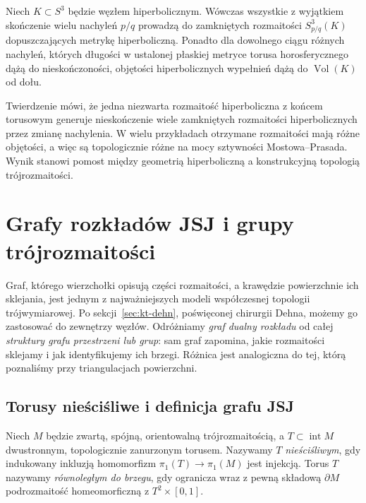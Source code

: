 \begin{twierdzenie}
Niech $K\subset S^3$ będzie węzłem hiperbolicznym.
Wówczas wszystkie z wyjątkiem skończenie wielu nachyleń
$p/q$ prowadzą do zamkniętych rozmaitości
$S^3_{p/q}(K)$ dopuszczających metrykę hiperboliczną.
Ponadto dla dowolnego ciągu różnych nachyleń, których
długości w ustalonej płaskiej metryce torusa horosferycznego
dążą do nieskończoności, objętości hiperbolicznych wypełnień
dążą do $\operatorname{Vol}(K)$ od dołu.
\end{twierdzenie}

\begin{uwaga}
Twierdzenie mówi, że jedna niezwarta rozmaitość hiperboliczna
z końcem torusowym generuje nieskończenie wiele zamkniętych
rozmaitości hiperbolicznych przez zmianę nachylenia.
W wielu przykładach otrzymane rozmaitości mają różne
objętości, a więc są topologicznie różne na mocy sztywności
Mostowa--Prasada. Wynik stanowi pomost między geometrią
hiperboliczną a konstrukcyjną topologią trójrozmaitości.
\end{uwaga}



\chapter{Grafy rozkładów JSJ i grupy trójrozmaitości}
\label{ch:tg-jsj-graphs}

Graf, którego wierzchołki opisują części rozmaitości,
a krawędzie powierzchnie ich sklejania, jest jednym z
najważniejszych modeli współczesnej topologii
trójwymiarowej. Po sekcji~\ref{sec:kt-dehn}, poświęconej
chirurgii Dehna, możemy go zastosować do zewnętrzy węzłów.
Odróżniamy \emph{graf dualny rozkładu}
od całej \emph{struktury grafu przestrzeni lub grup}:
sam graf zapomina, jakie rozmaitości sklejamy i jak
identyfikujemy ich brzegi. Różnica jest analogiczna
do tej, którą poznaliśmy przy triangulacjach powierzchni.

\section{Torusy nieściśliwe i definicja grafu JSJ}
\label{sec:tg-jsj-graph-def}

\begin{definicja}
Niech $M$ będzie zwartą, spójną, orientowalną
trójrozmaitością, a $T\subset\operatorname{int}M$
dwustronnym, topologicznie zanurzonym torusem.  Nazywamy $T$ \emph{nieściśliwym},
gdy indukowany inkluzją homomorfizm
$\pi_1(T)\to\pi_1(M)$ jest injekcją.
Torus $T$ nazywamy \emph{równoległym do brzegu},
gdy ogranicza wraz z pewną składową $\partial M$
podrozmaitość homeomorficzną z $T^2\times[0,1]$.
\end{definicja}

